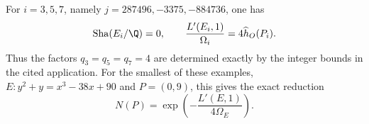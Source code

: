\begin{proposition}\label{ari:C.6.R4}
For $i=3,5,7$, namely $j=287496,-3375,-884736$, one has
\[
 \operatorname{Sha}(E_i/\Q)=0,\qquad
 \frac{L'(E_i,1)}{\Omega_i}=4\widehat h_O(P_i).
\]
Thus the factors $q_3=q_5=q_7=4$ are determined exactly by the integer bounds in the cited application. For the smallest of these examples,
$E:y^2+y=x^3-38x+90$ and $P=(0,9)$, this gives the exact
reduction
\[
 N(P)=\exp\left(-\frac{L'(E,1)}{4\Omega_E}\right).
\]
\end{proposition}
